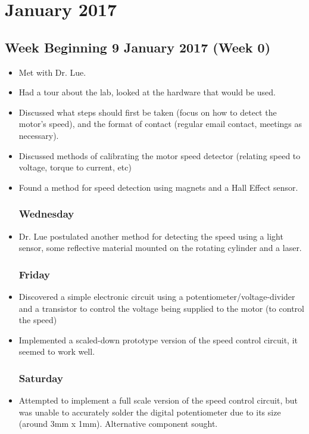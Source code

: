 \documentclass[a4]{report}
\def\mon{\subsection*{Monday}}
\def\wed{\subsection*{Wednesday}}
\def\fri{\subsection*{Friday}}
\begin{document}
	\chapter{January 2017}
	\section{Week Beginning 9 January 2017 (Week 0)}
	\begin{itemize}
		\mon
		\item Met with Dr. Lue.
		\item Had a tour about the lab, looked at the hardware that would be used.
		\item Discussed what steps should first be taken (focus on how to detect the motor's speed), and the format of contact (regular email contact, meetings as necessary).
		\item Discussed methods of calibrating the motor speed detector (relating speed to voltage, torque to current, etc)
		\item Found a method for speed detection using magnets and a Hall Effect sensor.
		\wed
		\item Dr. Lue postulated another method for detecting the speed using a light sensor, some reflective material mounted on the rotating cylinder and a laser.
		\fri
		\item Discovered a simple electronic circuit using a potentiometer/voltage-divider and a transistor to control the voltage being supplied to the motor (to control the speed)
		\item Implemented a scaled-down prototype version of the speed control circuit, it seemed to work well.
		\subsection*{Saturday}
		\item Attempted to implement a full scale version of the speed control circuit, but was unable to accurately solder the digital potentiometer due to its size (around 3mm x 1mm). Alternative component sought.
	\end{itemize}
	\newpage
\end{document}
